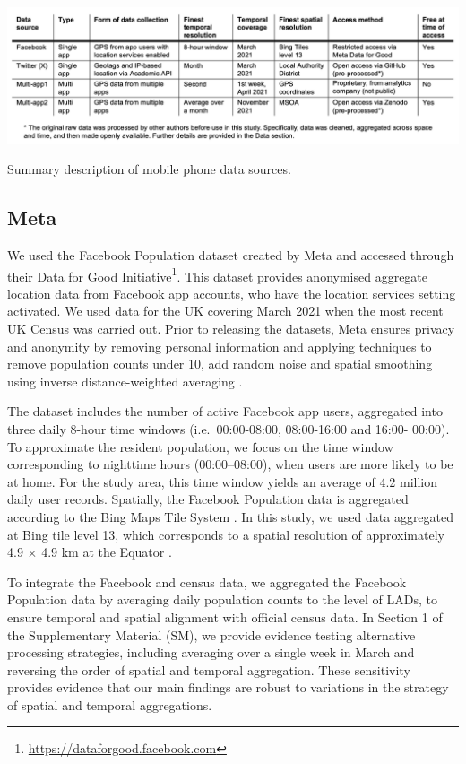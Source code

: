 \documentclass[]{rsos}%
\begin{document}
\begin{table}[h]
\centering
\includegraphics[width=1\linewidth]{figures/table-data-source.png}
\caption{Summary description of mobile phone data sources.}
\label{tab:data-source}
\end{table}

\subsection{Meta}\label{meta}

We used the Facebook Population dataset created by Meta and accessed
through their Data for Good Initiative\footnote{\url{https://dataforgood.facebook.com}}. This dataset provides
anonymised aggregate location data from Facebook app accounts, who have
the location services setting activated. We used data for the UK covering March 2021 when the most recent UK
Census was carried out. Prior to releasing the datasets, Meta ensures privacy and anonymity by removing personal information and applying techniques to remove population
counts under 10, add random noise and spatial smoothing using
inverse distance-weighted averaging \citep{maas2019}.

The dataset includes the number of active Facebook app users, aggregated
into three daily 8-hour time windows (i.e.~00:00-08:00, 08:00-16:00 and
16:00- 00:00). To approximate the resident population, we focus on the
time window corresponding to nighttime hours (00:00--08:00), when users
are more likely to be at home. For the study area, this time window
yields an average of 4.2 million daily user records. Spatially, the
Facebook Population data is aggregated according to the Bing Maps Tile
System \citep{bingmaps_tile_system}. In this study, we used data aggregated
at Bing tile level 13, which corresponds to a spatial resolution of
approximately 4.9 \(\times\) 4.9 km at the Equator \citep{maas2019}.

To integrate the Facebook and census data, we aggregated the Facebook
Population data by averaging daily population counts to the level of
LADs, to ensure temporal and spatial alignment with official census
data. In Section 1 of the Supplementary Material (SM), we provide evidence testing
alternative processing strategies, including averaging over a single
week in March and reversing the order of spatial and temporal
aggregation. These sensitivity provides evidence that our main findings
are robust to variations in the strategy of spatial and temporal
aggregations.
\end{document}
